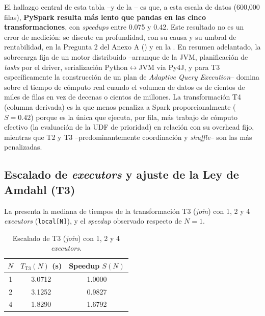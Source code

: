 \documentclass[11pt,a4paper]{article}
\begin{document}
    El hallazgo central de esta tabla --y de la -- es que, a esta escala de datos
    (600{,}000 filas), \textbf{PySpark resulta más lento que pandas en las cinco transformaciones},
    con \emph{speedups} entre 0.075 y 0.42. Este resultado no es un error de medición: se discute en
    profundidad, con su causa y su umbral de rentabilidad, en la Pregunta 2 del Anexo A
    () y en la . En resumen adelantado, la
    sobrecarga fija de un motor distribuido --arranque de la JVM, planificación de \emph{tasks} por
    el driver, serialización Python$\leftrightarrow$JVM vía Py4J, y para T3 específicamente la
    construcción de un plan de \emph{Adaptive Query Execution}-- domina sobre el tiempo de cómputo
    real cuando el volumen de datos es de cientos de miles de filas en vez de decenas o cientos de
    millones. La transformación T4 (columna derivada) es la que menos penaliza a Spark
    proporcionalmente ($S=0.42$) porque es la única que ejecuta, por fila, más trabajo de cómputo
    efectivo (la evaluación de la UDF de prioridad) en relación con su overhead fijo, mientras que
    T2 y T3 --predominantemente coordinación y \emph{shuffle}-- son las más penalizadas.

    \subsection{Escalado de \emph{executors} y ajuste de la Ley de Amdahl (T3)}
    \label{sec:resultados-amdahl}

    La  presenta la mediana de tiempos de la transformación T3 (\emph{join}) con
    1, 2 y 4 \emph{executors} (\texttt{local[N]}), y el \emph{speedup} observado respecto de $N=1$.

    \begin{table}[H]
        \centering
        \caption{Escalado de T3 (\emph{join}) con 1, 2 y 4 \emph{executors}.}
        \label{tab:escalado}
        \begin{tabular}{S[table-format=1.0] S[table-format=1.4] S[table-format=1.4]}
            \toprule
            {$N$} & {$T_{\text{T3}}(N)$ (\si{\second})} & {Speedup $S(N)$} \\
             & 3.0712 & 1.0000 \\
            2 & 3.1252 & 0.9827 \\
            4 & 1.8290 & 1.6792 \\
            \bottomrule
        \end{tabular}
    \end{table}
\end{document}
